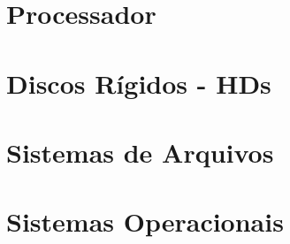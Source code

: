 \documentclass[dvips,ruledheader]{abnt}			%
\begin{document}




\tableofcontents

\part{Processador}


\part{Discos Rígidos - HDs}


\part{Sistemas de Arquivos}


\part{Sistemas Operacionais}


% 
% 
% 
% 
% 
% 
% 
% 

% 
% 
\end{document}
